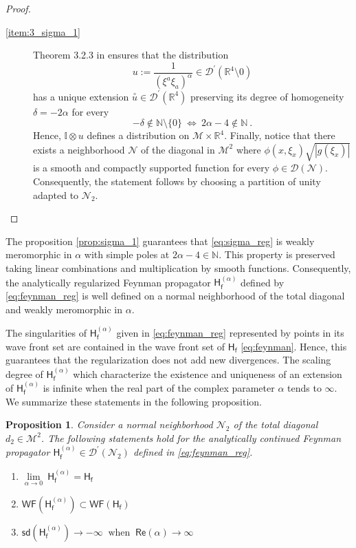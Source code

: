 \documentclass[11pt]{book}
\newcommand{\hilight}[1]{\colorbox{yellow!80!black}{#1}}
\newcommand{\WF}{\mathsf{WF}}
\newcommand{\sd}{\mathsf{sd}}
\renewcommand{\Re}{\mathsf{Re}}
\newcommand{\abs}[1]{\left|#1\right|}
\newcommand{\exte}[1]{\overset{\circ}{#1}}
\newcommand{\Dcal}{\mathcal{D}}
\newcommand{\Mcal}{\mathcal{M}}
\newcommand{\Ncal}{\mathcal{N}}
\newcommand{\Ibb}{\mathbb{I}}
\newcommand{\Nbb}{\mathbb{N}}
\newcommand{\Rbb}{\mathbb{R}}
\newcommand{\Hsf}{\mathsf{H}}
\newcommand{\fsf}{\mathsf{f}}
\theoremstyle{break}
\newtheorem{proposition}{Proposition}[chapter]
\begin{document}
\begin{proof}
\begin{description}
\item[\ref{item:3_sigma_1}] Theorem 3.2.3 in \cite{HORMANDER_1990} ensures that the distribution 
%
\begin{equation*}
u := \frac{1}{(\xi^{a}{\xi}_{a})^\alpha} \in\Dcal^\prime(\Rbb^4\setminus  0) 
\end{equation*}
%
has a unique extension $\exte{u} \in \Dcal^\prime(\Rbb^4)$ preserving its degree of homogeneity $\delta=-2\alpha$ for every 
%
\begin{equation*}
-\delta\notin\Nbb\setminus\{0\} \ \Leftrightarrow \ 2\alpha-4 \notin \Nbb \ .
\end{equation*}
%
Hence, $\Ibb\otimes u$ defines a distribution on $\Mcal \times \Rbb^4$.
Finally, notice that there exists a neighborhood $\Ncal$ of the diagonal in $\Mcal^2$
where $\phi(x,\xi_x) \sqrt{\abs{g(\xi_x)}}$ is a smooth and compactly supported function for every $\phi\in \Dcal(\Ncal)$. Consequently, the statement follows by choosing a partition of unity adapted to $\Ncal_2$.
\end{description}
%
\end{proof}


The proposition \ref{prop:sigma_1} guarantees that \eqref{eq:sigma_reg} is weakly meromorphic in $\alpha$ with simple poles at $2\alpha-4\in\Nbb$. This property is preserved taking linear combinations and multiplication by smooth functions. Consequently, the analytically regularized Feynman propagator $\Hsf^{(\alpha)}_\fsf$ defined by \eqref{eq:feynman_reg} is well defined on a normal neighborhood of the total diagonal and weakly meromorphic in $\alpha$. 


The singularities of $\Hsf^{(\alpha)}_\fsf$ given in \eqref{eq:feynman_reg} represented by points in its wave front set are contained in the wave front set of $\Hsf_\fsf$ \eqref{eq:feynman}. Hence, this guarantees that the regularization does not add new divergences. The scaling degree of $\Hsf^{(\alpha)}_\fsf$  which characterize the existence and uniqueness of an extension of $\Hsf^{(\alpha)}_\fsf$ is infinite when the real part of the complex parameter $\alpha$ tends to $\infty$. We summarize these statements in the following proposition.


\begin{proposition}\label{prop:wf_h_reg}
Consider a normal neighborhood $\Ncal_2$ of the total diagonal $d_2\in\Mcal^2$. The following statements hold for the analytically continued Feynman propagator $\Hsf^{(\alpha)}_\fsf\in\Dcal^\prime(\Ncal_2)$ defined in \eqref{eq:feynman_reg}.
%
\begin{enumerate}
\item\label{item:1_wf_h_reg} $\underset{\alpha \to 0}{\lim} \ \Hsf^{(\alpha)}_\fsf = \Hsf_\fsf$
%
\item\label{item:2_wf_h_reg} $\WF\left(\Hsf^{(\alpha)}_\fsf\right) \subset \WF\left(\Hsf_\fsf\right)$
%
\item\label{item:3_wf_h_reg} \hilight{$\sd\left(\Hsf^{(\alpha)}_\fsf\right) \to - \infty \ \mbox{ when } \ \Re\left(\alpha\right) \to \infty$}
\end{enumerate}
%
\end{proposition}
\end{document}
